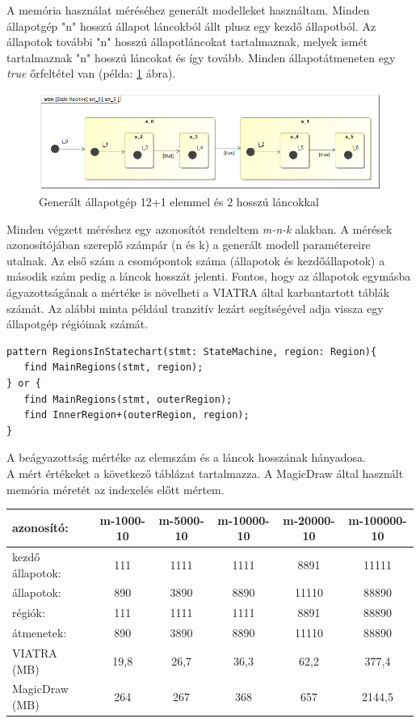 A memória használat méréséhez generált modelleket használtam. Minden állapotgép "n" hosszú állapot láncokból állt plusz egy kezdő állapotból. Az állapotok további "n" hosszú állapotláncokat tartalmaznak, melyek ismét tartalmaznak "n" hosszú láncokat és így tovább. Minden állapotátmeneten egy \emph{true} őrfeltétel van (példa: \ref{fig:generated} ábra).
\begin{figure}[!ht]
	\centering
	\includegraphics[width=12cm, keepaspectratio]{figures/evaluation/generated.png}
	\caption{Generált állapotgép 12+1 elemmel és 2 hosszú láncokkal}
	\label{fig:generated}
\end{figure}
\newpage
Minden végzett méréshez egy azonosítót rendeltem \emph{m-n-k} alakban. A mérések azonosítójában szereplő számpár (n és k) a generált modell paramétereire utalnak. Az első szám a csomópontok száma (állapotok és kezdőállapotok) a második szám pedig a láncok hosszát jelenti. Fontos, hogy az állapotok  egymásba ágyazottságának a mértéke is növelheti a VIATRA által karbantartott táblák számát. Az alábbi minta például tranzitív lezárt segítségével adja vissza egy állapotgép régióinak számát.
\begin{lstlisting}
pattern RegionsInStatechart(stmt: StateMachine, region: Region){
   find MainRegions(stmt, region);
} or {
   find MainRegions(stmt, outerRegion);
   find InnerRegion+(outerRegion, region);
}
\end{lstlisting}
 A beágyazottság mértéke az elemszám és a láncok hosszának hányadosa.\\

A mért értékeket a  következő táblázat tartalmazza. A MagicDraw által használt memória méretét az indexelés előtt mértem.\\

\hspace*{-1cm}
\begin{tabular}{l|ccccc}
azonosító: & m-1000-10 & m-5000-10 & m-10000-10 & m-20000-10 & m-100000-10 \\
\hline
kezdő állapotok: & 111 & 1111 & 1111 & 8891  & 11111 \\
állapotok:  & 890 & 3890 & 8890 & 11110 & 88890 \\
régiók: & 111 & 1111 & 1111 & 8891 & 88890\\
átmenetek: & 890 & 3890 & 8890 & 11110 & 88890\\
\hline
VIATRA (MB) & 19,8 & 26,7 & 36,3 & 62,2 & 377,4\\
MagicDraw (MB) & 264 & 267 & 368 & 657 & 2144,5 \\
\end{tabular}
\hspace*{-1cm}\\
\\
 
